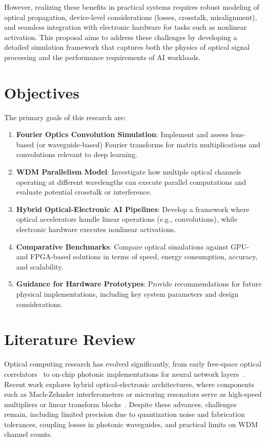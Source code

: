 \documentclass[conference]{IEEEtran}
\begin{document}
However, realizing these benefits in practical systems requires robust modeling of optical propagation, device-level considerations (losses, crosstalk, misalignment), and seamless integration with electronic hardware for tasks such as nonlinear activation. This proposal aims to address these challenges by developing a detailed simulation framework that captures both the physics of optical signal processing and the performance requirements of AI workloads.

\section{Objectives}
The primary goals of this research are:
\begin{enumerate}
    \item \textbf{Fourier Optics Convolution Simulation}: Implement and assess lens-based (or waveguide-based) Fourier transforms for matrix multiplications and convolutions relevant to deep learning.
    \item \textbf{WDM Parallelism Model}: Investigate how multiple optical channels operating at different wavelengths can execute parallel computations and evaluate potential crosstalk or interference.
    \item \textbf{Hybrid Optical-Electronic AI Pipelines}: Develop a framework where optical accelerators handle linear operations (e.g., convolutions), while electronic hardware executes nonlinear activations.
    \item \textbf{Comparative Benchmarks}: Compare optical simulations against GPU- and FPGA-based solutions in terms of speed, energy consumption, accuracy, and scalability.
    \item \textbf{Guidance for Hardware Prototypes}: Provide recommendations for future physical implementations, including key system parameters and design considerations.
\end{enumerate}

\section{Literature Review}
Optical computing research has evolved significantly, from early free-space optical correlators~\cite{goodman2005introduction} to on-chip photonic implementations for neural network layers~\cite{shen2017deep}. Recent work explores hybrid optical-electronic architectures, where components such as Mach-Zehnder interferometers or microring resonators serve as high-speed multipliers or linear transform blocks~\cite{hughes2018training}. Despite these advances, challenges remain, including limited precision due to quantization noise and fabrication tolerances, coupling losses in photonic waveguides, and practical limits on WDM channel counts. 
\end{document}
